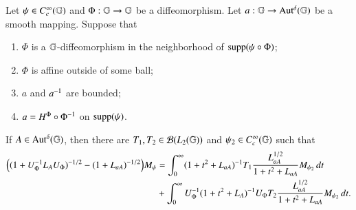 \documentclass[leqno]{amsart}
\begin{document}
	
	\begin{lemma}\label{deltadecomposition}
		Let $\psi\in C_{c}^{\infty}(\mathbb{G})$ and $\Phi:\mathbb{G}\rightarrow \mathbb{G}$ be a diffeomorphism. 
		Let $a:\mathbb{G}\rightarrow{\rm Aut^{\delta}}(\mathbb{G})$ be a smooth mapping. Suppose that
		\begin{enumerate}
			\item $\Phi$ is a $\mathbb{G}$-diffeomorphism in the neighborhood of ${\rm supp}(\psi\circ\Phi)$;
			
			\item $\Phi$ is affine outside of some ball;
			
			\item $a$ and $a^{-1}$ are bounded;
			
			\item $a=H^{\Phi}\circ\Phi^{-1}$ on ${\rm supp}(\psi)$.%
		\end{enumerate}
		If $A\in{\rm Aut^{\delta}}(\mathbb{G})$, then there are $T_{1},T_{2}\in{\mathcal B}(L_{2}(\mathbb{G}))$ and $\psi_{2}\in C_{c}^{\infty}(\mathbb{G})$ such that
		\begin{align*}
			\Big((1+U_{\Phi}^{-1}{L_{A}} U_{\Phi})^{-1/2}-(1+ L_{aA})^{-1/2}\Big)M_{\psi}
			&=\int_{0}^{\infty}(1+t^{2}+ L_{aA})^{-1}T_{1}\frac{ L_{aA}^{1/2}}{1+t^{2}+ L_{aA}}M_{\psi_{2}}\,dt\\
			&+\int_{0}^{\infty}U_{\Phi}^{-1}(1+t^{2}+{L_{A}})^{-1}U_{\Phi}T_{2}\frac{ L_{aA}^{1/2}}{1+t^{2}+ L_{aA}}M_{\psi_{2}}\,dt.
		\end{align*}
	\end{lemma}
\end{document}
